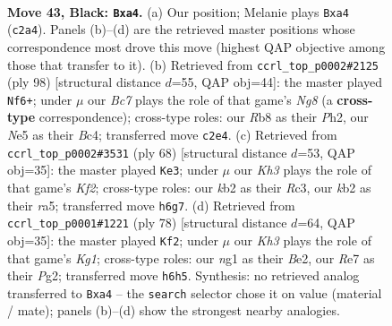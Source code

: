\documentclass[11pt]{article}
\begin{document}
\clearpage

\begin{figure}[p]\centering
\begin{subfigure}{0.46\textwidth}\centering
\resizebox{\linewidth}{!}{%
\newchessgame
\chessboard[
  setfen={1r6/4r3/1p5k/pBp1n3/P5p1/2P3P1/1KbN3P/4R1NR b - - 8 43},
  showmover=false,
  pgfstyle=straightmove, color=movearrow, markmove={c2-a4}
]}
\caption{}
\end{subfigure}\hfill
\begin{subfigure}{0.46\textwidth}\centering
\resizebox{\linewidth}{!}{%
\newchessgame
\chessboard[
  setfen={2R3N1/p5bk/3p2p1/P4p1p/2B2P2/4P1P1/2rn3P/6K1 w - - 8 50},
  showmover=false,
  pgfstyle=straightmove, color=movearrow, markmove={g8-f6}
]}
\caption{}
\end{subfigure}
\\[4pt]
\begin{subfigure}{0.46\textwidth}\centering
\resizebox{\linewidth}{!}{%
\newchessgame
\chessboard[
  setfen={2r3k1/5p1p/3pb1p1/rBn3P1/3NP3/2R2P2/5K1P/3R4 w - - 2 35},
  showmover=false,
  pgfstyle=straightmove, color=movearrow, markmove={f2-e3}
]}
\caption{}
\end{subfigure}\hfill
\begin{subfigure}{0.46\textwidth}\centering
\resizebox{\linewidth}{!}{%
\newchessgame
\chessboard[
  setfen={7k/1p1r3p/p1nNb3/8/P4p2/2P4P/3RB1P1/6K1 w - - 6 40},
  showmover=false,
  pgfstyle=straightmove, color=movearrow, markmove={g1-f2}
]}
\caption{}
\end{subfigure}
\caption{\textbf{Move 43, Black: \texttt{Bxa4}.} (a) Our position; Melanie plays \texttt{Bxa4} (\texttt{c2a4}). Panels (b)--(d) are the retrieved master positions whose correspondence most drove this move (highest QAP objective among those that transfer to it). (b) Retrieved from \texttt{ccrl\_top\_p0002\#2125} (ply 98) [structural distance $d$=55, QAP obj=44]: the master played \texttt{Nf6+}; under $\mu$ our \emph{Bc7} plays the role of that game's \emph{Ng8} (a \textbf{cross-type} correspondence); cross-type roles: our \emph{R}b8 as their \emph{P}h2, our \emph{N}e5 as their \emph{B}c4; transferred move \texttt{c2e4}. (c) Retrieved from \texttt{ccrl\_top\_p0002\#3531} (ply 68) [structural distance $d$=53, QAP obj=35]: the master played \texttt{Ke3}; under $\mu$ our \emph{Kh3} plays the role of that game's \emph{Kf2}; cross-type roles: our \emph{k}b2 as their \emph{R}c3, our \emph{k}b2 as their \emph{r}a5; transferred move \texttt{h6g7}. (d) Retrieved from \texttt{ccrl\_top\_p0001\#1221} (ply 78) [structural distance $d$=64, QAP obj=35]: the master played \texttt{Kf2}; under $\mu$ our \emph{Kh3} plays the role of that game's \emph{Kg1}; cross-type roles: our \emph{n}g1 as their \emph{B}e2, our \emph{R}e7 as their \emph{P}g2; transferred move \texttt{h6h5}. Synthesis: no retrieved analog transferred to \texttt{Bxa4} -- the \texttt{search} selector chose it on value (material / mate); panels (b)--(d) show the strongest nearby analogies.}
\label{fig:thought-m85}
\end{figure}
\end{document}
